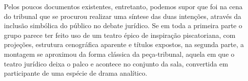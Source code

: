 
Pelos poucos documentos existentes, entretanto, podemos supor que foi
na cena do tribunal que se procurou realizar uma síntese das duas
intenções, através da inclusão simbólica do público no debate jurídico.
Se em toda a primeira parte o grupo parece ter feito uso de um teatro
épico de inspiração piscatoriana, com projeções, estrutura cenográfica
aparente e títulos expostos, na segunda parte, a montagem se aproximou da
forma clássica da peça-tribunal, aquela em que o teatro jurídico deixa o
palco e acontece no conjunto da sala, convertida em participante de uma
espécie de drama analítico.


